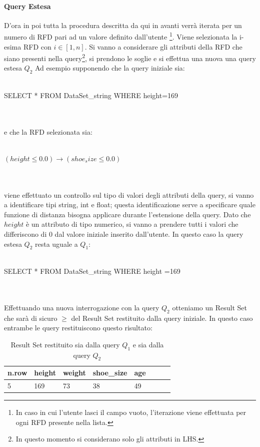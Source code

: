 \paragraph{Query Estesa}
D'ora in poi tutta la procedura descritta da qui in avanti verrà iterata per un numero di RFD pari ad un valore definito dall'utente \footnote{In caso in cui l'utente lasci il campo vuoto, l'iterazione viene effettuata per ogni RFD presente nella lista.}.
Viene selezionata la i-esima RFD con $i\in[1,n]$. 
Si vanno a considerare gli attributi della RFD che siano presenti nella query\footnote{In questo momento si considerano solo gli attributi in LHS.}, si prendono le soglie e si effettua una nuova una query estesa $Q_2$
Ad esempio supponendo che la query iniziale sia: 
\\~\\ 
\centerline{SELECT * FROM DataSet{\_}string WHERE height=169} 
\\~\\
e che la RFD selezionata sia: 
\\~\\ 
\centerline{$(height \leq 0.0)  \rightarrow(shoe_size \leq 0.0)$}
\\~\\
viene effettuato un controllo sul tipo di valori degli attributi della query,
si vanno a identificare tipi string, int e float; questa identificazione serve a specificare quale funzione di distanza bisogna applicare durante l'estensione della query.
Dato che $height$ è un attributo di tipo numerico, si vanno a prendere tutti i valori che differiscono di 0 dal valore iniziale inserito dall'utente. In questo caso la query estesa $Q_2$ resta uguale a $Q_1$: 
\\~\\
\centerline{SELECT * FROM DataSet{\_}string WHERE height =169} 
\\~\\
Effettuando una nuova interrogazione con la query $Q_2$ otteniamo un Result Set che sarà di sicuro $\geq$ del Result Set restituito dalla query iniziale.
In questo caso entrambe le query restituiscono questo risultato: \newline 
\begin{table}[H]
    \centering
    \begin{tabular}{l l l l l l l l}
    n.row   & height & weight & shoe{\_}size & age \\
    \hline
    5 & 169 & 73 & 38 & 49 \\
    \end{tabular}
    \caption{Result Set restituito sia dalla query $Q_1$ e sia dalla query $Q_2$ }
    \label{tab:sta_ext_result_set}
\end{table}
